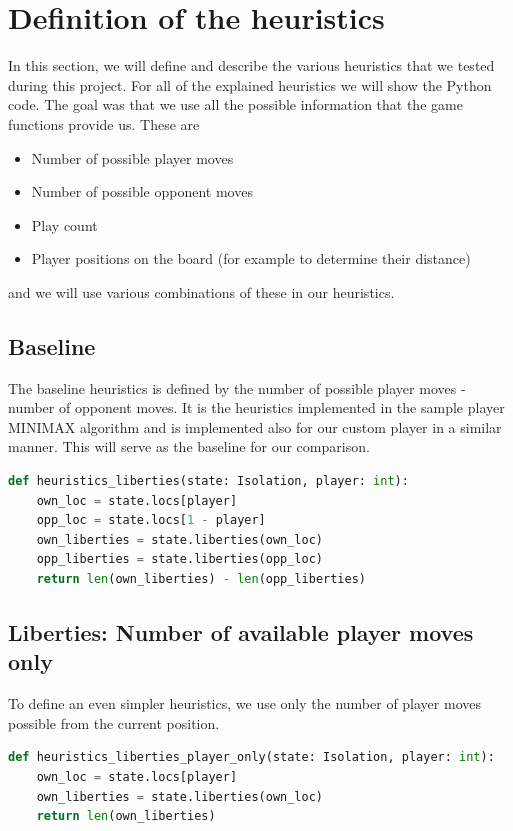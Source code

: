 \documentclass[aps,prd,notitlepage,floatfix,superscriptaddress,groupedaddress,nofootinbib]{revtex4-1}
\begin{document}
\section{Definition of the heuristics}

In this section, we will define and describe the various heuristics that we tested during this project. For all of the explained heuristics we will show the Python code. The goal was that we use all the possible information that the game functions provide us. These are
\begin{itemize}
    \item Number of possible player moves
    \item Number of possible opponent moves
    \item Play count
    \item Player positions on the board (for example to determine their distance)
\end{itemize}
and we will use various combinations of these in our heuristics.

\subsection{Baseline}
The baseline heuristics is defined by the number of possible player moves - number of opponent moves. It is the heuristics implemented in the sample player MINIMAX algorithm and is implemented also for our custom player in a similar manner. This will serve as the baseline for our comparison.

\begin{lstlisting}[language=python]
def heuristics_liberties(state: Isolation, player: int):
    own_loc = state.locs[player]
    opp_loc = state.locs[1 - player]
    own_liberties = state.liberties(own_loc)
    opp_liberties = state.liberties(opp_loc)
    return len(own_liberties) - len(opp_liberties)
\end{lstlisting}

\subsection*{Liberties: Number of available player moves only}
To define an even simpler heuristics, we use only the number of player moves possible from the current position.

\begin{lstlisting}[language=python]
def heuristics_liberties_player_only(state: Isolation, player: int):
    own_loc = state.locs[player]
    own_liberties = state.liberties(own_loc)
    return len(own_liberties)
\end{lstlisting}
\end{document}
